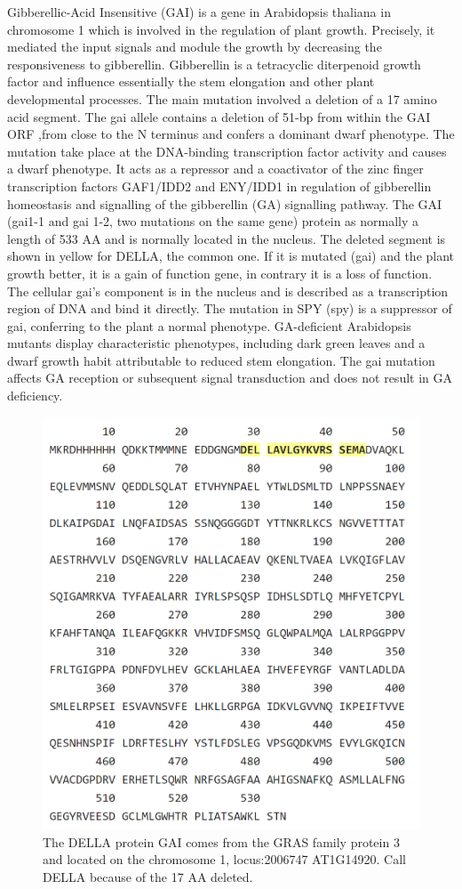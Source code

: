 \documentclass[10pt,a4paper]{article}
\begin{document}
Gibberellic-Acid Insensitive (GAI) is a gene in Arabidopsis thaliana in chromosome 1 which is involved in the regulation of plant growth.  Precisely, it mediated the input signals and module the growth by decreasing the responsiveness to gibberellin\cite{peng_arabidopsis_1997}.
Gibberellin is a tetracyclic diterpenoid growth factor and influence essentially the stem elongation and other plant developmental processes\cite{hooley_gibberellins:_nodate}.
The main mutation involved a deletion of a 17 amino acid segment. The gai allele contains a deletion of 51-bp from within the GAI ORF ,from close to the N terminus and confers a dominant dwarf phenotype. The mutation take place at the DNA-binding transcription factor activity and causes a dwarf phenotype. It acts as a repressor and a coactivator of the zinc finger transcription factors GAF1/IDD2 and ENY/IDD1 in regulation of gibberellin homeostasis and signalling of the gibberellin (GA) signalling pathway. The GAI (gai1-1 and gai 1-2, two mutations on the same gene) protein as normally a length of 533 AA and is normally located in the nucleus. The deleted segment is shown in yellow for DELLA, the common one\cite{peng_arabidopsis_1997}\cite{lee_gibberellin_2002}.
If it is mutated (gai) and the plant growth better, it is a gain of function gene, in contrary it is a loss of function. The cellular gai’s component is in the nucleus and is described as a transcription region of DNA and bind it directly. The mutation in SPY (spy) is a suppressor of gai, conferring to the plant a normal phenotype. GA-deficient Arabidopsis mutants display characteristic phenotypes, including dark green leaves and a dwarf growth habit attributable to reduced stem elongation\cite{peng_arabidopsis_1997}.
The gai mutation affects GA reception or subsequent signal transduction and does not result in GA deficiency\cite{hooley_gibberellins:_nodate}.


\begin{figure}[H]
	\centering
	\includegraphics[width=0.4\linewidth]{img/dellamutation}
	\caption{The DELLA protein GAI comes from the GRAS family protein 3 and located on the chromosome 1, locus:2006747 AT1G14920. Call DELLA because of the 17 AA deleted.}
	\label{fig:dellamutation}
\end{figure}
\end{document}

